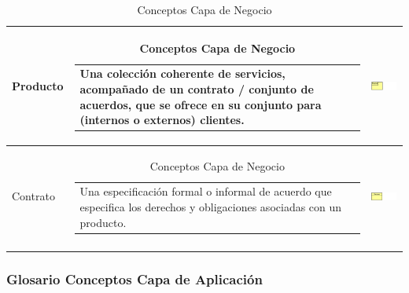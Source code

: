 \begin{longtable}[c]{|p{2.5cm}|l|c|}
	Producto				    & \begin{tabular}[c]{p{7cm}@{}l@{}}Una colección coherente de servicios, acompañado de un contrato / conjunto de acuerdos, que se ofrece en su conjunto para (internos o externos) clientes.\end{tabular} & \includegraphics[width=35mm]{arquitectura/adm_lenguaje/imgs/business/Product}          \\ \hline
	Contrato				    & \begin{tabular}[c]{p{7cm}@{}l@{}}Una especificación formal o informal de acuerdo que especifica los derechos y obligaciones asociadas con un producto.\end{tabular} & \includegraphics[width=35mm]{arquitectura/adm_lenguaje/imgs/business/Contract}          \\ \hline
	\caption{Conceptos Capa de Negocio \cite{WEB7}}
\end{longtable}

\newpage

\subsubsection{Glosario Conceptos Capa de Aplicación}

